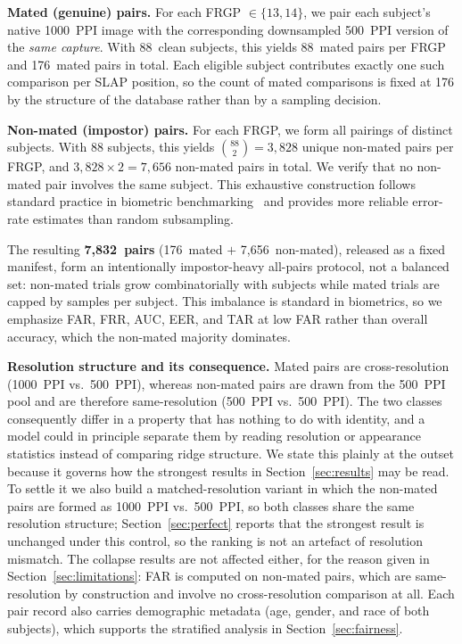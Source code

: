 \documentclass[runningheads]{llncs}
\begin{document}
\textbf{Mated (genuine) pairs.}
For each FRGP $\in \{13, 14\}$, we pair each subject's native 1000~PPI
image with the corresponding downsampled 500~PPI version of the
\emph{same capture}.
With 88~clean subjects, this yields 88~mated pairs per FRGP and 176~mated
pairs in total.
Each eligible subject contributes exactly one such comparison per SLAP
position, so the count of mated comparisons is fixed at 176 by the
structure of the database rather than by a sampling decision.

\textbf{Non-mated (impostor) pairs.}
For each FRGP, we form all pairings of distinct subjects.
With 88 subjects, this yields $\binom{88}{2} = 3{,}828$ unique non-mated
pairs per FRGP, and $3{,}828 \times 2 = 7{,}656$ non-mated pairs in total.
We verify that no non-mated pair involves the same subject.
This exhaustive construction follows standard practice in biometric
benchmarking~\cite{facerecbench2025} and provides more reliable
error-rate estimates than random subsampling.

The resulting \textbf{7,832~pairs} (176~mated $+$ 7,656~non-mated), released as
a fixed manifest, form an intentionally impostor-heavy all-pairs protocol, not
a balanced set: non-mated trials grow combinatorially with subjects while mated
trials are capped by samples per subject. This imbalance is standard in
biometrics, so we emphasize FAR, FRR, AUC, EER, and TAR at low FAR rather than
overall accuracy, which the non-mated majority dominates.

\textbf{Resolution structure and its consequence.}
Mated pairs are cross-resolution (1000~PPI vs.\ 500~PPI), whereas
non-mated pairs are drawn from the 500~PPI pool and are therefore
same-resolution (500~PPI vs.\ 500~PPI).
The two classes consequently differ in a property that has nothing to do
with identity, and a model could in principle separate them by reading
resolution or appearance statistics instead of comparing ridge structure.
We state this plainly at the outset because it governs how the strongest
results in Section~\ref{sec:results} may be read. To settle it we also build a
matched-resolution variant in which the non-mated pairs are formed as
1000~PPI vs.\ 500~PPI, so both classes share the same resolution structure;
Section~\ref{sec:perfect} reports that the strongest result is unchanged under
this control, so the ranking is not an artefact of resolution mismatch.
The collapse results are not affected either, for the
reason given in Section~\ref{sec:limitations}: FAR is computed on non-mated
pairs, which are same-resolution by construction and involve no
cross-resolution comparison at all.
Each pair record also carries demographic metadata (age, gender, and race
of both subjects), which supports the stratified analysis in
Section~\ref{sec:fairness}.
\end{document}
